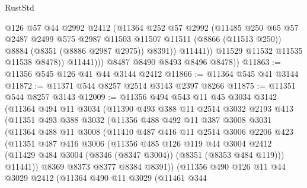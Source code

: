 \begin{lexlean}{RustStd}
\begin{coremodule}
{\begin{coremodule}
{{{{{{{{{{{{{{{{{{{{{{{{{{{{{{{{{{{{{{{{{{{{{{{{{{                      @126
                      @57
                      @44
                      @2992
                      @2412
                      (@11364
                        @252
                        @57
                        @2992
                        (@11485
                          @250
                          @65
                          @57
                          @2487
                          @2499
                          @575
                          @2987
                          @11503
                          @11507
                          @11511
                          (@8866 (@11513 @250))
                          @8884
                          (@8351 (@8886 @2987 @2975))
                          @8391))
                      @11441))
                  @11529
                  @11532
                  @11535
                  @11538
                  @8478))
              @11441)))
        @8487
        @8490
        @8493
        @8496
        @8478))
@11863 := @11356 @545 @126 @41 @44 @3144 @2412
@11866 := @11364 @545 @41 @3144
@11872 := @11371 @544 @8257 @2514 @3143 @2397 @8266
@11875 := @11351 @544 @8257 @3143
@12009 := @11356
    @494
    @543
    @11
    @45
    @3034
    @3142
    (@11364
      @494
      @11
      @3034
      (@11390
        @493
        @388
        @11
        @2514
        @3032
        @2193
        @413
        (@11351
          @493
          @388
          @3032
          (@11356
            @488
            @492
            @11
            @387
            @3008
            @3031
            (@11364
              @488
              @11
              @3008
              (@11410
                @487
                @416
                @11
                @2514
                @3006
                @2206
                @423
                (@11351
                  @487
                  @416
                  @3006
                  (@11356
                    @485
                    @126
                    @119
                    @44
                    @3004
                    @2412
                    (@11429 @484 @3004 (@8346 (@8347 @3004)) (@8351 (@8353 @484 @119)))
                    @11441))
                @8369
                @8373
                @8377
                @8384
                @8391))
            (@11356
              @490
              @126
              @11
              @44
              @3029
              @2412
              (@11364
                @490
                @11
                @3029
                (@11461
                  @344
}}}}}}}}}}}}}}}}}}}}}}}}}}}}}}}}}}}}}}}}}}}}}}}}}}
\end{coremodule}}
\end{coremodule}
\end{lexlean}

